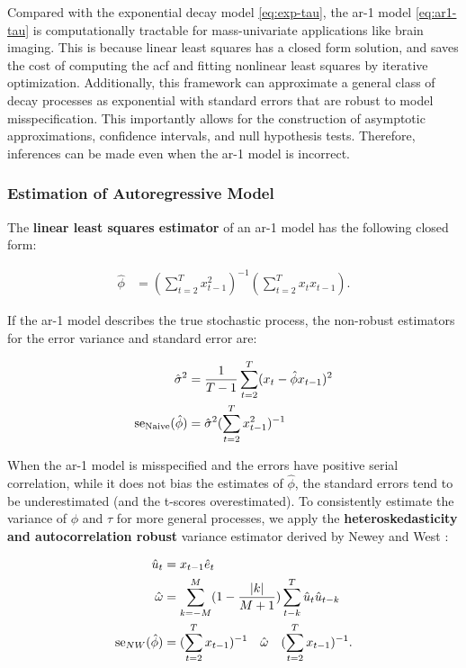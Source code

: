 \documentclass[main.tex]{subfiles}
\begin{document}
Compared with the exponential decay model \eqref{eq:exp-tau}, the ar-1 model \eqref{eq:ar1-tau} is computationally tractable for mass-univariate applications like brain imaging. This is because linear least squares has a closed form solution, and saves the cost of computing the acf and fitting nonlinear least squares by iterative optimization. Additionally, this framework can approximate a general class of decay processes as exponential with standard errors that are robust to model misspecification. This importantly allows for the construction of asymptotic approximations, confidence intervals, and null hypothesis tests. Therefore, inferences can be made even when the ar-1 model is incorrect.

\subsubsection{Estimation of Autoregressive Model}
The \textbf{linear least squares estimator} of an ar-1 model has the following closed form:

\begin{align}
    \hat\phi &= (\sum_{t=2}^T x_{t-1}^2)^{-1} (\sum_{t=2}^T x_t x_{t-1}).
\end{align}

If the ar-1 model describes the true stochastic process, the non-robust estimators for the error variance and standard error are: 

\begin{align}
    \hat\sigma^2 &= \frac{1}{T-1} \sum_{t=2}^T (x_t - \hat\phi x_{t-1})^2 \notag\\
    \text{se}_\text{Naive}(\hat\phi) &= \hat\sigma^2 (\sum_{t=2}^T x_{t-1}^2)^{-1}
\end{align}

When the ar-1 model is misspecified and the errors have positive serial correlation, 
while it does not bias the estimates of $\hat \phi$, the standard errors tend to be underestimated (and the t-scores overestimated). To consistently estimate the variance of $\phi$ and $\tau$ for more general processes, we apply the \textbf{heteroskedasticity and autocorrelation robust} variance estimator derived by Newey and West \cite{newey_simple_1987}:

\begin{align}
    \hat u_t &= x_{t-1} \hat e_t \notag\\
    \hat \omega &= \sum_{k=-M}^M (1 - \frac{|k|}{M+1}) \sum_{t-k}^T \hat u_t \hat u_{t-k} \notag\\
    \text{se}_{NW}(\hat\phi) &= (\sum_{t=2}^T x_{t-1})^{-1} \quad \hat \omega \quad (\sum_{t=2}^T x_{t-1})^{-1}.
\end{align}
\end{document}
